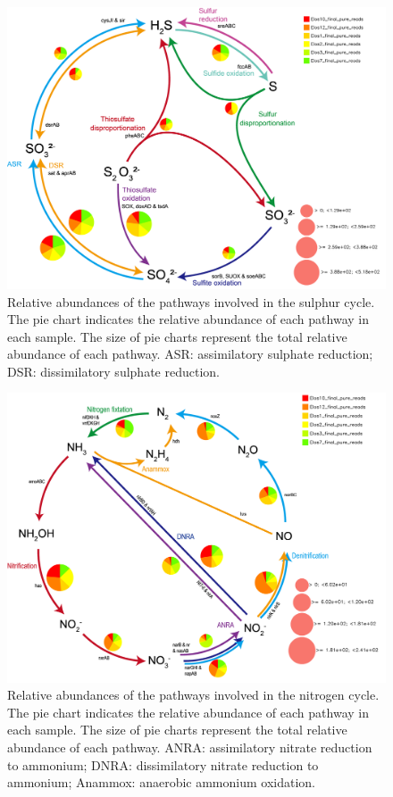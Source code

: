    \begin{figure}[!htbp]
      \centering
      \includegraphics[width=0.98\columnwidth]{figures/sulfur_cycle_karpathos.png}
      \caption[Relative abundances of the pathways involved in the sulphur cycle]{
         Relative abundances of the pathways involved in the sulphur cycle. 
         The pie chart indicates the relative abundance of each pathway in each sample. 
         The size of pie charts represent the total relative abundance of each pathway. 
         ASR: assimilatory sulphate reduction; DSR: dissimilatory sulphate reduction.
      }
      \label{fig:karpathos-sulfur}
   \end{figure}   


   \begin{figure}[!htbp]
      \centering
      \includegraphics[width=0.98\columnwidth]{figures/nitrogen_cycle_karpathos.png}
      \caption[Relative abundances of the pathways involved in the nitrogen cycle]{
         Relative abundances of the pathways involved in the nitrogen cycle. 
         The pie chart indicates the relative abundance of each pathway in each sample. 
         The size of pie charts represent the total relative abundance of each pathway. 
         ANRA: assimilatory nitrate reduction to ammonium; 
         DNRA: dissimilatory nitrate reduction to ammonium; 
         Anammox: anaerobic ammonium oxidation. 
      }
      \label{fig:karpathos-nitrogen}
   \end{figure}   


